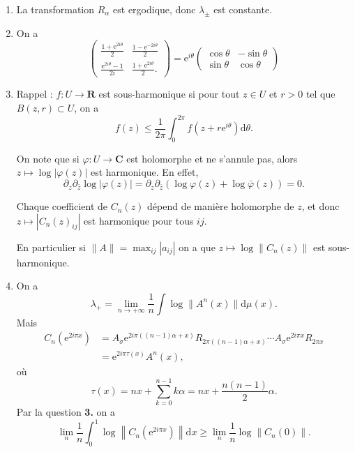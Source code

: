 \documentclass[a4paper,12pt,openany]{article}
\theoremstyle{plain}
\theoremstyle{definition}
\newcommand{\e}{\mathrm{e}}
\newcommand{\dd}{\mathrm{d}}
\newcommand{\R}{\mathbf{R}}
\newcommand{\C}{\mathbf{C}}
\begin{document}
\begin{enumerate}
\item  La transformation $R_\alpha$ est ergodique, donc $\lambda_\pm$ est constante.
\item On a 
$$
\left(
\begin{matrix}
\displaystyle{\frac{1+\e^{2i\theta}}{2}} & \displaystyle{\frac{1-\e^{-2i\theta}}{2}} \\ \displaystyle{\frac{\e^{2i\theta} - 1}{2i}} & \displaystyle{\frac{1 + \e^{2i\theta}}{2}}.
\end{matrix}
\right) 
= 
\e^{i\theta} \begin{pmatrix} \cos \theta & -\sin \theta \\ \sin \theta & \cos \theta \end{pmatrix}
$$
\item Rappel : $f : U \to \R$ est sous-harmonique si pour tout $z \in U$ et $r > 0$ tel que $B(z,r) \subset U$, on a 
$$
f(z) \leqslant \frac{1}{2\pi} \int_0^{2\pi}f\left(z + r\e^{i\theta}\right) \dd \theta.
$$

On note que si $\varphi : U \to \C$ est holomorphe et ne s'annule pas, alors $z \mapsto \log|\varphi(z)|$ est harmonique. En effet,
$$
\partial_z\partial_{\bar z} \log |\varphi(z)| = \partial_z\partial_{\bar z} \left( \log \varphi(z) + \log \bar \varphi(z)\right) = 0.
$$



Chaque coefficient de $C_n(z)$ d\'epend de mani\`ere holomorphe de $z$, et donc $z \mapsto |C_n(z)_{ij}|$ est harmonique pour tous $ij$.  

En particulier si $\|A\| = \max_{ij}|a_{ij}|$ on a que $z \mapsto \log \|C_n(z)\|$ est sous-harmonique. 

\item On a 
$$
\lambda_+ = \lim_{n \to +\infty} \frac{1}{n} \int \log \|A^n(x)\| \dd \mu(x).
$$
 Mais
$$
\begin{aligned}
C_n\left(\e^{2i\pi x}\right) &= A_\sigma \e^{2i\pi((n-1)\alpha + x)}R_{2\pi((n-1) \alpha + x)} \cdots  A_\sigma \e^{2i\pi x}R_{2\pi x} \\
&= \e^{2i\pi \tau(x)} A^n(x),
\end{aligned}
$$
 o\`u
$$
\tau(x) = nx + \sum_{k=0}^{n-1} k \alpha = nx + \frac{n(n-1)}{2}\alpha.
$$
 Par la question \textbf{3.} on a 
$$
\lim_n \frac{1}{n} \int_0^1 \log \left\|C_n\left(\e^{2i\pi x}\right)\right\| \dd x \geqslant \lim_n \frac{1}{n} \log \|C_n(0)\|.
$$




\end{enumerate}
\end{document}
